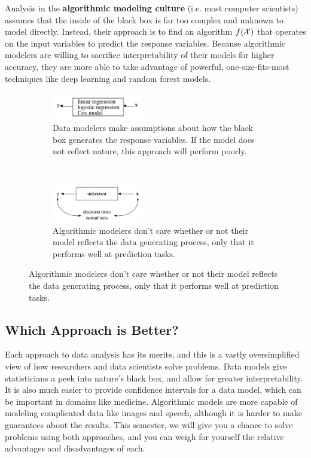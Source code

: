 \documentclass{discussion}
\begin{document}
Analysis in the \textbf{algorithmic modeling culture} (i.e. most computer scientists) assumes that the inside of the black box is far too complex and unknown to model directly.  Instead, their approach is to find an algorithm $f(\mathcal{X})$ that operates on the input variables to predict the response variables.  Because algorithmic modelers are willing to sacrifice interpretability of their models for higher accuracy, they are more able to take advantage of powerful, one-size-fits-most techniques like deep learning and random forest models.

\begin{figure}[h!]
    \centering
    \begin{subfigure}[t]{0.5\textwidth}
        \centering
        \includegraphics[width=150px]{images/data-model}
        \caption{Data modelers make assumptions about how the black box generates the response variables.  If the model does not reflect nature, this approach will perform poorly.}
    \end{subfigure}%
    ~ 
    \begin{subfigure}[t]{0.5\textwidth}
        \centering
        \includegraphics[width=150px]{images/algorithmic-model}
        \caption{Algorithmic modelers don't care whether or not their model reflects the data generating process, only that it performs well at prediction tasks.}
    \end{subfigure}
\end{figure}

\subsection*{Which Approach is Better?}

Each approach to data analysis has its merits, and this is a vastly oversimplified view of how researchers and data scientists solve problems.  Data models give statisticians a peek into nature's black box, and allow for greater interpretability.  It is also much easier to provide confidence intervals for a data model, which can be important in domains like medicine.  Algorithmic models are more capable of modeling complicated data like images and speech, although it is harder to make guarantees about the results.  This semester, we will give you a chance to solve problems using both approaches, and you can weigh for yourself the relative advantages and disadvantages of each.
\end{document}
